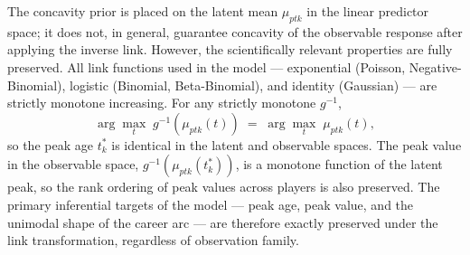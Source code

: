 The concavity prior is placed on the latent mean $\mu_{ptk}$ in the linear predictor space; it does not, in general, guarantee concavity of the observable response after applying the inverse link.  However, the scientifically relevant properties are fully preserved.  All link functions used in the model --- exponential (Poisson, Negative-Binomial), logistic (Binomial, Beta-Binomial), and identity (Gaussian) --- are strictly monotone increasing.  For any strictly monotone $g^{-1}$,
\[
  \arg\max_t \; g^{-1}(\mu_{ptk}(t)) \;=\; \arg\max_t \; \mu_{ptk}(t),
\]
so the peak age $t^*_k$ is identical in the latent and observable spaces.  The peak value in the observable space, $g^{-1}(\mu_{ptk}(t^*_k))$, is a monotone function of the latent peak, so the rank ordering of peak values across players is also preserved.  The primary inferential targets of the model --- peak age, peak value, and the unimodal shape of the career arc --- are therefore exactly preserved under the link transformation, regardless of observation family.


